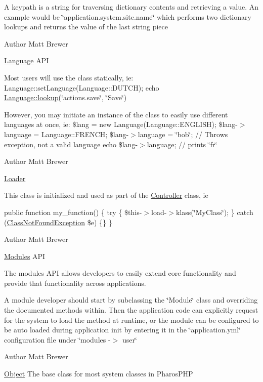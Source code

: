 A keypath is a string for traversing dictionary contents and retrieving a value. An example would be \char`\"{}application.system.site.name\char`\"{} which performs two dictionary lookups and returns the value of the last string piece

\begin{DoxyAuthor}{Author}
Matt Brewer
\end{DoxyAuthor}
\hyperlink{class_language}{Language} API

Most users will use the class statically, ie: Language::setLanguage(Language::DUTCH); echo \hyperlink{class_language_a317563c27ce7fe4e6161b83abb72d60f}{Language::lookup}(\char`\"{}actions.save\char`\"{}, \char`\"{}Save\char`\"{})

However, you may initiate an instance of the class to easily use different languages at once, ie: \$lang = new Language(Language::ENGLISH); \$lang-\/$>$language = Language::FRENCH; \$lang-\/$>$language = \char`\"{}bob\char`\"{}; // Throws exception, not a valid language echo \$lang-\/$>$language; // prints \char`\"{}fr\char`\"{}

\begin{DoxyAuthor}{Author}
Matt Brewer
\end{DoxyAuthor}
\hyperlink{class_loader}{Loader}

This class is initialized and used as part of the \hyperlink{class_controller}{Controller} class, ie

public function my\_\-function() \{ try \{ \$this-\/$>$load-\/$>$klass(\char`\"{}MyClass\char`\"{}); \} catch (\hyperlink{class_class_not_found_exception}{ClassNotFoundException} \$e) \{\} \}

\begin{DoxyAuthor}{Author}
Matt Brewer
\end{DoxyAuthor}
\hyperlink{class_modules}{Modules} API

The modules API allows developers to easily extend core functionality and provide that functionality across applications.

A module developer should start by subclassing the \char`\"{}Module\char`\"{} class and overriding the documented methods within. Then the application code can explicitly request for the system to load the method at runtime, or the module can be configured to be auto loaded during application init by entering it in the \char`\"{}application.yml\char`\"{} configuration file under \char`\"{}modules -\/$>$ user\char`\"{}

\begin{DoxyAuthor}{Author}
Matt Brewer
\end{DoxyAuthor}
\hyperlink{class_object}{Object} The base class for most system classes in PharosPHP

